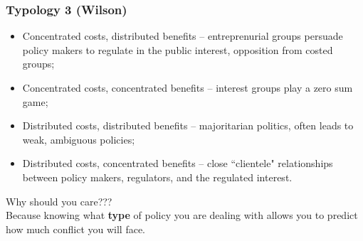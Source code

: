 \documentclass[aspectratio=169]{beamer}
\theoremstyle{principle}
\begin{document}
\begin{frame}
\frametitle{Typology 3 (Wilson)}
\begin{itemize}
\item Concentrated costs, distributed benefits -- entreprenurial groups persuade policy makers to regulate in the public interest, opposition from costed groups;
\bigskip
\bigskip
\item Concentrated costs, concentrated benefits -- interest groups play a zero sum game;
\bigskip
\bigskip
\item Distributed costs, distributed benefits -- majoritarian politics, often leads to weak, ambiguous policies;
\bigskip
\bigskip
\item Distributed costs, concentrated benefits -- close ``clientele" relationships between policy makers, regulators, and the regulated interest.
\end{itemize}
\end{frame}

\begin{frame}
\begin{center}
\Huge Why should you care???\\
\bigskip
\bigskip
{}
\Large Because knowing what \textbf{type} of policy you are dealing with allows you to predict how much conflict you will face.
\end{center}
\end{frame}
\end{document}

